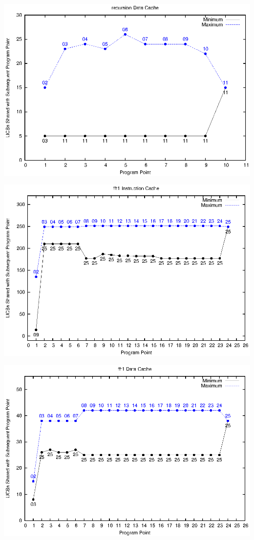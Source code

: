 \documentclass[12pt]{article}
\begin{document}
\includegraphics{eps/recursion-dcache.eps}


\includegraphics{eps/fft1-icache.eps}

\includegraphics{eps/fft1-dcache.eps}
\end{document}
